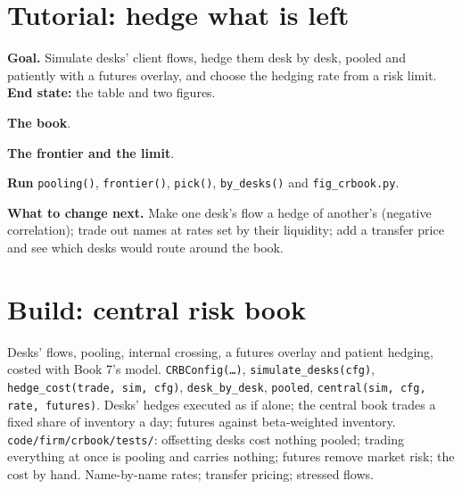 \section{Tutorial: hedge what is left}\label{tut:s2:the-central-risk-book:tut}

\begin{tutorial}
\textbf{Goal.} Simulate desks' client flows, hedge them desk by desk, pooled and patiently with a futures overlay, and choose the hedging rate from a
risk limit. \textbf{End state:} the table and two figures.
\begin{tutsteps}
\item \textbf{The book}.
\label{lst:s2:the-central-risk-book:book}
\item \textbf{The frontier and the limit}.
\label{lst:s2:the-central-risk-book:frontier}
\item \textbf{Run} \texttt{pooling()}, \texttt{frontier()}, \texttt{pick()}, \texttt{by\_desks()} and \texttt{fig\_crbook.py}.
\end{tutsteps}
\textbf{What to change next.} Make one desk's flow a hedge of another's (negative correlation); trade out names at rates set by their liquidity; add a
transfer price and see which desks would route around the book.
\end{tutorial}

\section{Build: central risk book}\label{bld:s2:the-central-risk-book:crbook}

\begin{build}
 Desks' flows, pooling, internal crossing, a futures overlay and patient hedging, costed with Book 7's model.
 \texttt{CRBConfig(\dots)}, \texttt{simulate\_desks(cfg)}, \texttt{hedge\_cost(trade, sim, cfg)}, \texttt{desk\_by\_desk},
\texttt{pooled}, \texttt{central(sim, cfg, rate, futures)}.
 Desks' hedges executed as if alone; the central book trades a fixed share of inventory a day; futures against beta-weighted
inventory.
 \texttt{code/firm/crbook/tests/}: offsetting desks cost nothing pooled; trading everything at once is pooling and carries
nothing; futures remove market risk; the cost by hand.
 Name-by-name rates; transfer pricing; stressed flows.
\end{build}

